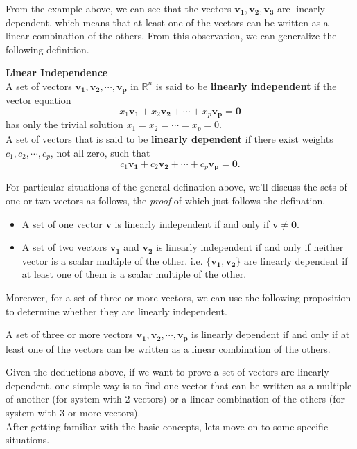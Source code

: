 \documentclass[10pt, a4paper]{article}
\begin{document}
\indent From the example above, we can see that the vectors $\mathbf{v_1}, \mathbf{v_2}, \mathbf{v_3}$ are linearly dependent, which means that at least one of the vectors can be written as a linear combination of the others. From this observation, we can generalize the following definition.
\begin{definition}
    \textbf{Linear Independence}\\
    A set of vectors $\mathbf{v_1}, \mathbf{v_2}, \cdots, \mathbf{v_p}$ in $\mathbb{R}^n$ is said to be \textbf{linearly independent} if the vector equation $$x_1 \mathbf{v_1}+x_2 \mathbf{v_2}+\cdots+x_p \mathbf{v_p}=\mathbf{0}$$ has only the trivial solution $x_1=x_2=\cdots=x_p=0$.\\
    A set of vectors that is said to be \textbf{linearly dependent} if there exist weights $c_1, c_2, \cdots, c_p$, not all zero, such that $$c_1 \mathbf{v_1}+c_2 \mathbf{v_2}+\cdots+c_p \mathbf{v_p}=\mathbf{0}.$$
\end{definition}
\indent For particular situations of the general defination above, we'll discuss the sets of one or two vectors as follows, the \textit{proof} of which just follows the defination.
\begin{itemize}
    \item A set of one vector $\mathbf{v}$ is linearly independent if and only if $\mathbf{v}\neq \mathbf{0}$.
    \item A set of two vectors $\mathbf{v_1}$ and $\mathbf{v_2}$ is linearly independent if and only if neither vector is a scalar multiple of the other. i.e. $\{\mathbf{v_1}, \mathbf{v_2}\}$ are linearly dependent if at least one of them is a scalar multiple of the other.
\end{itemize}
Moreover, for a set of three or more vectors, we can use the following proposition to determine whether they are linearly independent.
\begin{proposition}
    A set of three or more vectors $\mathbf{v_1}, \mathbf{v_2}, \cdots, \mathbf{v_p}$ is linearly dependent if and only if at least one of the vectors can be written as a linear combination of the others.
\end{proposition}
\indent Given the deductions above, if we want to prove a set of vectors are linearly dependent, one simple way is to find one vector that can be written as a multiple of another (for system with 2 vectors) or a linear combination of the others (for system with 3 or more vectors).\\
\indent After getting familiar with the basic concepts, lets move on to some specific situations.
\end{document}
